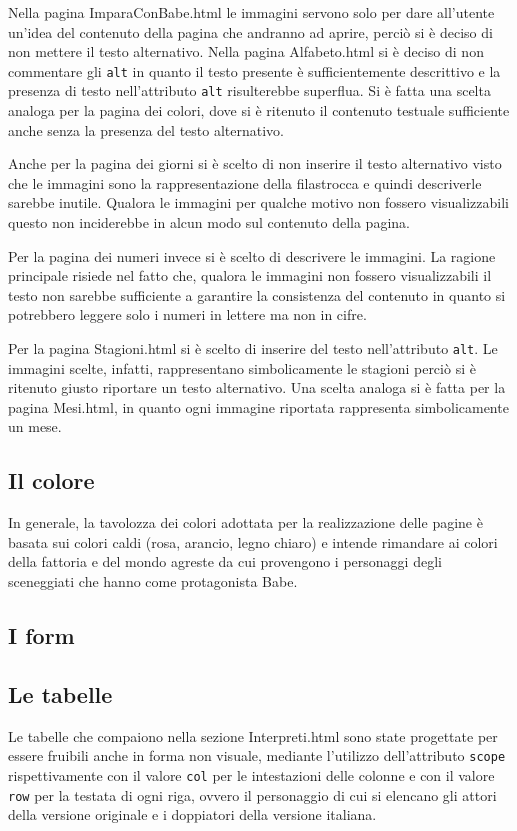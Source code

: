 \documentclass[10pt,a4paper,onecolumn]{article}
\newcommand{\sitepage}[1]{\textsf{#1}}
\begin{document}
Nella pagina \sitepage{ImparaConBabe.html} le immagini servono solo per dare all'utente un'idea del contenuto della pagina che andranno ad aprire, perciò si è deciso di non mettere il testo alternativo. 
Nella pagina \sitepage{Alfabeto.html} si è deciso di non commentare gli \texttt{alt} in quanto il testo presente è sufficientemente descrittivo e la presenza di testo nell'attributo \texttt{alt} risulterebbe superflua.
Si è fatta una scelta analoga per la pagina dei colori, dove si è ritenuto il contenuto testuale sufficiente anche senza la presenza del testo alternativo.

Anche per la pagina dei giorni si è scelto di non inserire il testo alternativo visto che le immagini sono la rappresentazione della filastrocca e quindi descriverle sarebbe inutile.
Qualora le immagini per qualche motivo non fossero visualizzabili questo non inciderebbe in alcun modo sul contenuto della pagina.

Per la pagina dei numeri invece si è scelto di descrivere le immagini.
La ragione principale risiede nel fatto che, qualora le immagini non fossero visualizzabili il testo non sarebbe sufficiente a garantire la consistenza del contenuto in quanto si potrebbero leggere solo i numeri in lettere ma non in cifre.

Per la pagina \sitepage{Stagioni.html} si è scelto di inserire del testo nell'attributo \texttt{alt}. Le immagini scelte, infatti,  rappresentano simbolicamente le stagioni perciò si è ritenuto giusto riportare un testo alternativo.
Una scelta analoga si è fatta per la pagina \sitepage{Mesi.html}, in quanto ogni immagine riportata rappresenta simbolicamente un mese.

\subsection{Il colore}
In generale, la tavolozza dei colori adottata per la realizzazione delle pagine è basata sui colori caldi (rosa, arancio, legno chiaro) e intende rimandare ai colori della fattoria e del mondo agreste da cui provengono i personaggi degli sceneggiati che hanno come protagonista Babe.


\subsection{I form}

\subsection{Le tabelle}
Le tabelle che compaiono nella sezione \sitepage{Interpreti.html} sono state progettate per essere fruibili anche in forma non visuale, mediante l'utilizzo dell'attributo \texttt{scope} rispettivamente con il valore \texttt{col} per le intestazioni delle colonne e con il valore \texttt{row} per la testata di ogni riga, ovvero il personaggio di cui si elencano gli attori della versione originale e i doppiatori della versione italiana.
\end{document}
